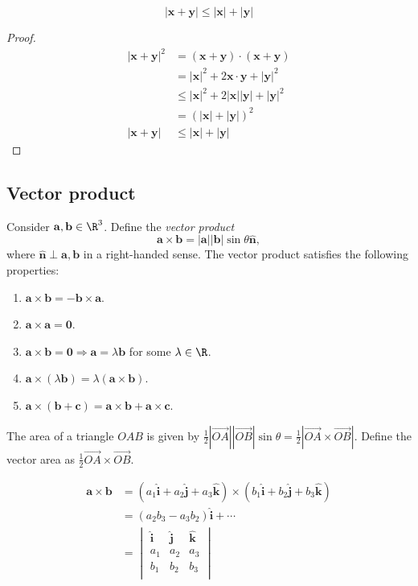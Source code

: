 \documentclass[a4paper]{article}
\begin{document}
\begin{cor}
  \[
    \mathbf{|x + y|} \leq \mathbf{|x| + |y|}
  \]
\end{cor}
\begin{proof}
  \begin{align*}
    |\mathbf{x + y}|^2 &= \mathbf{(x + y)\cdot (x + y)}\\
    &= |\mathbf{x}|^2 + 2\mathbf{x\cdot y} + |\mathbf{y}|^2\\
    &\leq |\mathbf{x}|^2 + 2\mathbf{|x||y|} + |\mathbf{y}|^2\\
    &= (\mathbf{|x| + |y|})^2\\
    \mathbf{|x + y|} &\leq \mathbf{|x| + |y|}
  \end{align*}
\end{proof}

\subsection{Vector product}
\begin{defi}
  Consider $\mathbf{a, b}\in \R^3$. Define the \emph{vector product}
  \[
    \mathbf{a\times b} = \mathbf{|a||b|}\sin\theta \hat{\mathbf{n}},
  \]
  where $\mathbf{\hat{n}\perp a, b}$ in a right-handed sense. The vector product satisfies the following properties:
  \begin{enumerate}
    \item $\mathbf{a\times b = -b\times a}$.
    \item $\mathbf{a\times a = 0}$.
    \item $\mathbf{a\times b = 0}\Rightarrow \mathbf{a} = \lambda\mathbf{b}$ for some $\lambda\in \R$.
    \item $\mathbf{a}\times (\lambda \mathbf{b}) = \lambda(\mathbf{a\times b})$.
    \item $\mathbf{a\times (b + c) = a\times b + a\times c}$.
  \end{enumerate}
\end{defi}

The area of a triangle $OAB$ is given by $\frac{1}{2}|\overrightarrow{OA}||\overrightarrow{OB}|\sin\theta = \frac{1}{2}|\overrightarrow{OA}\times\overrightarrow{OB}|$. Define the vector area as $\frac{1}{2}\overrightarrow{OA}\times\overrightarrow{OB}$.

\begin{prop}
  \begin{align*}
    \mathbf{a\times b} &= (a_1\hat{\mathbf{i}} + a_2\hat{\mathbf{j}} + a_3\hat{\mathbf{k}})\times(b_1\hat{\mathbf{i}} + b_2\hat{\mathbf{j}} + b_3\hat{\mathbf{k}})\\
    &= (a_2b_3 - a_3b_2)\hat{\mathbf{i}} + \cdots\\
    &= \begin{vmatrix} \hat{\mathbf{i}} & \hat{\mathbf{j}} & \hat{\mathbf{k}}\\
      a_1 & a_2 & a_3\\
      b_1 & b_2 & b_3\\
    \end{vmatrix}
  \end{align*}
\end{prop}
\end{document}
